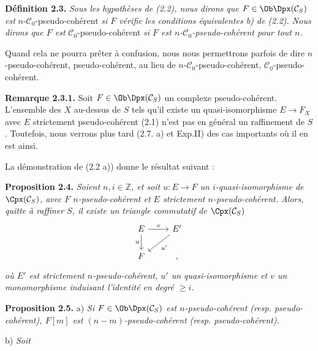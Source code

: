 \textbf{Définition 2.3.} \emph{Sous les hypothèses de (2.2), nous dirons que \(F\in\Ob\Dpx(\mathcal C_S)\) est} \(n\)-\(\mathcal C_0\)-pseudo-cohérent \emph{si \(F\) vérifie les conditions équivalentes b) de (2.2). Nous dirons que \(F\) est} \(\mathcal C_0\)-pseudo-cohérent \emph{si \(F\) est \(n\)-\(\mathcal C_0\)-pseudo-cohérent pour tout \(n\).}

Quand cela ne pourra prêter à confusion, nous nous permettrons parfois de dire \(n\)-pseudo-cohérent, pseudo-cohérent, au lieu de \(n\)-\(\mathcal C_0\)-pseudo-cohérent, \(\mathcal C_0\)-pseudo-cohérent.

\textbf{Remarque 2.3.1.} Soit \(F\in\Ob\Dpx(\mathcal C_S)\) un complexe pseudo-cohérent. L'ensemble des \(X\) au-dessus de \(S\) tels qu'il existe un quasi-isomorphisme \(E\longrightarrow F_X\) avec \(E\) strictement pseudo-cohérent (2.1) n'est pas en général un raffinement de \(S\). Toutefois, nous verrons plus tard (2.7. a) et Exp.II) des cas importants où il en est ainsi.

La démonstration de (2.2 a)) donne le résultat suivant :

\textbf{Proposition 2.4.} \emph{Soient \(n,i\in\mathbb Z\), et soit \(u:E\to F\) un \(i\)-quasi-isomorphisme de \(\Cpx(\mathcal C_S)\), avec \(F\) \(n\)-pseudo-cohérent et \(E\) strictement \(n\)-pseudo-cohérent. Alors, quitte à raffiner \(S\), il existe un triangle commutatif de \(\Cpx(\mathcal C_S)\)}
\[
\begin{tikzcd}
E \arrow[r,"v"] \arrow[d,"u"'] & E' \arrow[dl,"u'"]\\
F & ,
\end{tikzcd}
\]
\emph{où \(E'\) est strictement \(n\)-pseudo-cohérent, \(u'\) un quasi-isomorphisme et \(v\) un monomorphisme induisant l'identité en degré \(\geq i\).}

\textbf{Proposition 2.5.} a) \emph{Si \(F\in\Ob\Dpx(\mathcal C_S)\) est \(n\)-pseudo-cohérent (resp. pseudo-cohérent), \(F[m]\) est \((n-m)\)-pseudo-cohérent (resp. pseudo-cohérent).}

b) \emph{Soit}
